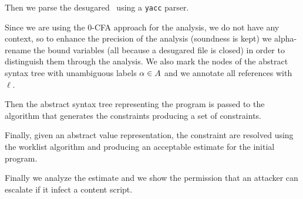 Then we parse the desugared \ljs\ using a \texttt{yacc} parser.

Since we are using the 0-CFA approach for the analysis, we do not have any context, so to enhance the precision of the analysis (soundness is kept) we alpha-rename the bound variables (all because a desugared file is closed) in order to distinguish them through the analysis. We also mark the nodes of the abstract syntax tree with unambiguous labels $\alpha \in A$ and we annotate all references with $\ell$. 

Then the abstract syntax tree representing the program is passed to the algorithm that generates the constraints producing a set of constraints.

Finally, given an abstract value representation, the constraint are resolved using the worklist algorithm and producing an acceptable estimate for the initial program.

Finally we analyze the estimate and we show the permission that an attacker can escalate if it infect a content script.
